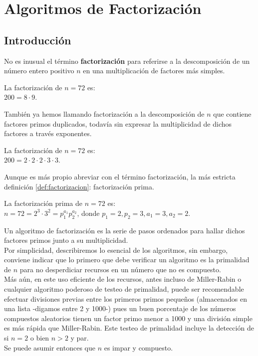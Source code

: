 \chapter{Algoritmos de Factorización}
\section{Introducción}
No es inusual el término \textbf{factorización} para referirse a la descomposición 
de un número entero positivo $n$ en una multiplicación de factores más simples.

\begin{ejemplo}
La factorización de $n=72$ es: \\
$200 = 8 \cdot 9$.
\end{ejemplo}

También ya hemos llamando factorización a la descomposición de $n$ que contiene
factores primos duplicados, todavía sin expresar la multiplicidad de dichos factores a través exponentes.

\begin{ejemplo}
La factorización de $n=72$ es: \\
$200 = 2 \cdot 2 \cdot 2 \cdot 3 \cdot 3$.
\end{ejemplo}

Aunque es más propio abreviar con el término factorización, la más estricta definición \ref{def:factorizacion}: factorización prima.

\begin{ejemplo}
La factorización prima de $n=72$ es: \\
$n = 72 = 2^3 \cdot 3^2 = p_1^{a_1} p_2^{a_2}$, donde $p_1=2, p_2=3, a_1=3, a_2=2$.
\end{ejemplo}

Un algoritmo de factorización es la serie de pasos ordenados para hallar dichos factores primos junto a su multiplicidad. \\

Por simplicidad, describiremos lo esencial de los algoritmos, sin embargo, conviene indicar que lo primero que debe verificar un algoritmo es la primalidad de $n$ para no desperdiciar recursos en un número que no es compuesto. \\
Más aún, en este uso eficiente de los recursos, antes incluso de Miller-Rabin o cualquier algoritmo poderoso de testeo de primalidad, puede ser recomendable efectuar divisiones previas entre los primeros primos pequeños (almacenados en una lista -digamos entre 2 y 1000-) pues un buen porcentaje de los números compuestos aleatorios tienen un factor primo menor a 1000 y una división simple es más rápida que Miller-Rabin. Este testeo de primalidad incluye la detección de si $n=2$ o bien $n>2$ y par. \\
Se puede asumir entonces que $n$ es impar y compuesto.

